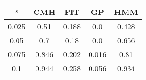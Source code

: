 \centering \begin{tabular}{c|c|c|c|c}
$s$	&CMH	&FIT	&GP	&HMM\\\hline
0.025	&0.51	&0.188	&0.0	&0.428\\
0.05	&0.7	&0.18	&0.0	&0.656\\
0.075	&0.846	&0.202	&0.016	&0.81\\
0.1	&0.944	&0.258	&0.056	&0.934\\
\end{tabular}
